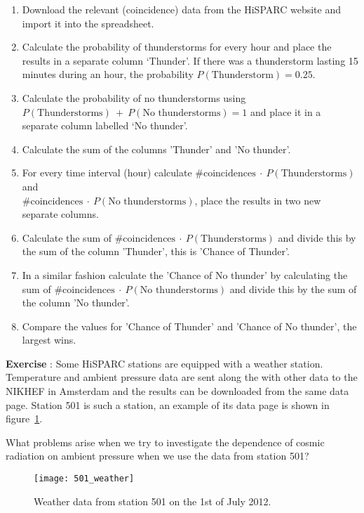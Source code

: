 \begin{enumerate}[1]
\item Download the relevant (coincidence) data from the HiSPARC website and import it into the spreadsheet.
\item Calculate the probability of thunderstorms for every hour and place the results in a separate column `Thunder'. If there was a thunderstorm lasting 15 minutes during an hour, the probability $P(\mbox{Thunderstorm}) = 0.25$.
\item Calculate the probability of no thunderstorms using\\ $P(\mbox{Thunderstorms})~+~P(\mbox{No thunderstorms}) = 1$ and place it in a separate column labelled `No thunder'.
\item Calculate the sum of the columns 'Thunder' and 'No thunder'.
\item For every time interval (hour) calculate $\mbox{\#coincidences} ~\cdot~  P(\mbox{Thunderstorms})$ and \\$\mbox{\#coincidences} ~\cdot~ P(\mbox{No thunderstorms})$, place the results in two new separate columns.
\item Calculate the sum of $\mbox{\#coincidences} ~\cdot~ P(\mbox{Thunderstorms})$ and divide this by the sum of the column 'Thunder', this is 'Chance of Thunder'.
\item In a similar fashion calculate the 'Chance of No thunder' by calculating the sum of $\mbox{\#coincidences} ~\cdot~ P(\mbox{No thunderstorms})$ and divide this by the sum of the column 'No thunder'.
\item Compare the values for 'Chance of Thunder' and 'Chance of No thunder', the largest wins.
\end{enumerate}

\begin{shaded}
\textbf{Exercise \theExercise {}} : Some HiSPARC stations are equipped with a weather station. Temperature and ambient pressure data are sent along the with other data to the NIKHEF in Amsterdam and the results can be downloaded from the same data page. Station 501 is such a station, an example of its data page is shown in figure~\ref{fig:501_weather}.

What problems arise when we try to investigate the dependence of cosmic radiation on ambient pressure when we use the data from station 501?
\end{shaded}

\begin{figure}\begin{center}
\texttt{[image: 501\_weather]}
\caption{Weather data from station 501 on the 1st of July 2012.}\label{fig:501_weather}
\end{center}\end{figure}

